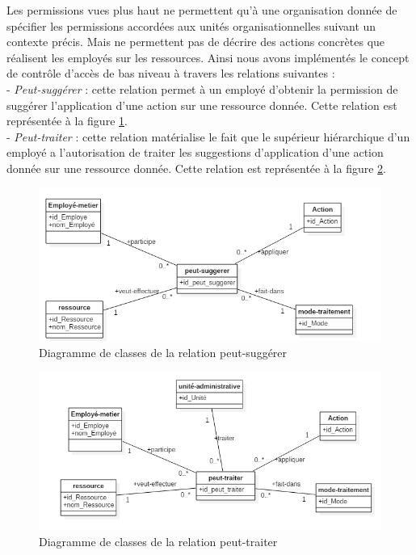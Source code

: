 Les permissions vues plus haut ne permettent qu'à une organisation donnée de spécifier les permissions accordées aux unités organisationnelles suivant un contexte précis. Mais ne permettent pas de décrire des actions concrètes que réalisent les employés sur les ressources. Ainsi nous avons implémentés le concept de contrôle d'accès de bas niveau à travers les relations suivantes : \\
- \textit{Peut-suggérer} : cette relation permet à un employé d'obtenir la permission de suggérer l'application d'une action sur une ressource donnée. Cette relation est représentée à la figure \ref{figpeut-suggerer}.\\
- \textit{Peut-traiter} : cette relation matérialise le fait que le supérieur hiérarchique d'un employé a l'autorisation de traiter les suggestions d'application d'une action donnée sur une ressource donnée. Cette relation est représentée à la figure \ref{figpeut-traiter}.

\begin{figure}[h!]
    \centering
		\includegraphics[scale=0.7]{chap3/images/peut-suggerer.png}
    \caption{Diagramme de classes de la relation peut-suggérer}
	 \label{figpeut-suggerer}
\end{figure} 

\begin{figure}[h!]
    \centering
		\includegraphics[scale=0.7]{chap3/images/peut-traiter.png}
    \caption{Diagramme de classes de la relation peut-traiter}
	 \label{figpeut-traiter}
\end{figure} 

